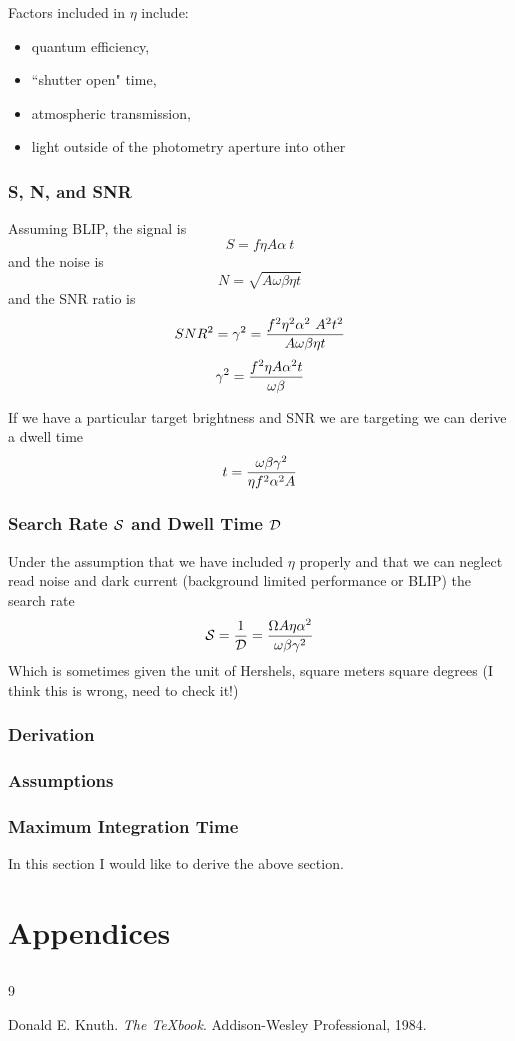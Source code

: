 \documentclass[12pt, letterpaper, onecolumn]{book}
\begin{document}
Factors included in $\eta$ include:
\begin{itemize}[noitemsep]
	\item quantum efficiency,
	\item ``shutter open" time,
	\item atmospheric transmission,
	\item light outside of the photometry aperture into other %
\end{itemize}


\subsection{S, N, and SNR}
Assuming BLIP, the signal is 
$$S  = f \eta  A \alpha\  t $$
and the noise is 
$$N = \sqrt{A \omega \beta \eta t }$$
and the SNR ratio is
$$SNR^2 = \gamma^2 = {f^2 \eta^2 \alpha^2 \ A^2 t^2 \over A \omega\beta\eta t}$$
$$ \gamma^2 = {f^2 \eta A \alpha^2 t \over \omega\beta} $$

If we have a particular target brightness and SNR we are targeting we 
can derive a dwell time
$$t = {\omega\beta\gamma^2 \over   \eta f^2 \alpha^2  A  }  $$

\subsection{Search Rate $\cal{S}$  and Dwell Time $\cal{D}$}
Under the assumption that we have included $\eta$ properly
and that we can neglect read noise and dark current (background limited 
performance or BLIP) the search rate
$$ \mathcal{S} = {1 \over \cal{D}} = \frac{\Omega A \eta \alpha^2 }{\omega\beta \gamma^2 } $$
Which is sometimes given the unit of Hershels, square meters square degrees
(I think this is wrong, need to check it!)

\subsection{Derivation  }


\subsection{Assumptions}

\subsection{Maximum Integration Time}
In this section I would like to derive the above section.



\chapter{Appendices}
\section{}

\begin{thebibliography}{9}

Donald E. Knuth.
\emph{The \TeX{}book}.
Addison-Wesley Professional, 1984.

\end{thebibliography}
\end{document}
